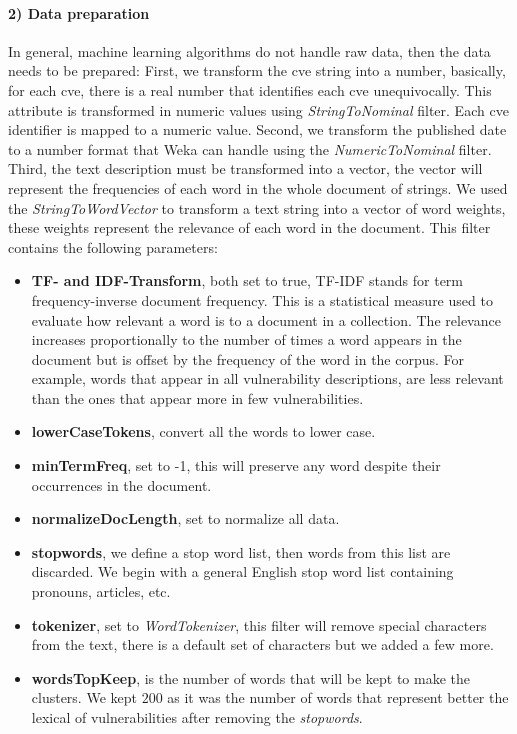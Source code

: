 \paragraph{2) Data preparation}
In general, machine learning algorithms do not handle raw data, then the data needs to be prepared:
First, we transform the \gls{cve} string into a number, basically, for each \gls{cve}, there is a real number that identifies each \gls{cve} unequivocally. 
This attribute is transformed in numeric values using \emph{StringToNominal} filter. 
Each \gls{cve} identifier is mapped to a numeric value.
Second, we transform the published date to a number format that Weka can handle using the \emph{NumericToNominal} filter.
Third, the text description must be transformed into a vector, the vector will represent the frequencies of each word in the whole document of strings. 
We used the \emph{StringToWordVector} to transform a text string into a vector of word weights, these weights represent the relevance of each word in the document.
This filter contains the following parameters:
\begin{itemize}
\item \textbf{TF- and IDF-Transform}, both set to true, TF-IDF stands for term frequency-inverse document frequency. 
This is a statistical measure used to evaluate how relevant a word is to a document in a collection. 
The relevance increases proportionally to the number of times a word appears in the document but is offset by the frequency of the word in the corpus. 
For example, words that appear in all vulnerability descriptions, are less relevant than the ones that appear more in few vulnerabilities.
\item \textbf{lowerCaseTokens}, convert all the words to lower case.
\item \textbf{minTermFreq}, set to -1, this will preserve any word despite their occurrences in the document.
\item \textbf{normalizeDocLength}, set to normalize all data.
\item \textbf{stopwords}, we define a stop word list, then words from this list are discarded. We begin with a general English stop word list containing pronouns, articles, etc. 
\item \textbf{tokenizer}, set to \emph{WordTokenizer}, this filter will remove special characters from the text, there is a default set of characters but we added a few more.
\item \textbf{wordsTopKeep}, is the number of words that will be kept to make the clusters. We kept $200$ as it was the number of words that represent better the lexical of vulnerabilities after removing the \emph{stopwords}.
\end{itemize}


